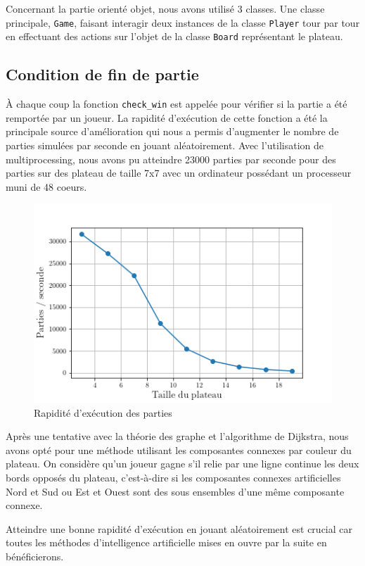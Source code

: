 \documentclass[a4paper]{article}
\theoremstyle{definition}
\begin{document}
Concernant la partie orienté objet, nous avons utilisé 3 classes. Une classe principale, \texttt{Game}, faisant interagir deux instances de la classe \texttt{Player} tour par tour en effectuant des actions sur l'objet de la classe \texttt{Board} représentant le plateau.

\subsection{Condition de fin de partie}

À chaque coup la fonction \texttt{check\_win} est appelée pour vérifier si la partie a été remportée par un joueur. La rapidité d'exécution de cette fonction a été la principale source d'amélioration qui nous a permis d'augmenter le nombre de parties simulées par seconde en jouant aléatoirement. Avec l'utilisation de multiprocessing, nous avons pu atteindre 23000 parties par seconde pour des parties sur des plateau de taille 7x7 avec un ordinateur possédant un processeur muni de 48 coeurs.


\begin{figure}[h]
	\centering
	\includegraphics[scale=0.6]{pps.png}
	\caption{Rapidité d'exécution des parties}
	\label{fig:pps}
\end{figure}


Après une tentative avec la théorie des graphe et l'algorithme de Dijkstra, nous avons opté pour une méthode utilisant les composantes connexes par couleur du plateau. 
On considère qu'un joueur gagne s'il relie par une ligne continue les deux bords opposés du plateau, c'est-à-dire si les composantes connexes artificielles Nord et Sud ou Est et Ouest sont des sous ensembles d'une même composante connexe.


Atteindre une bonne rapidité d'exécution en jouant aléatoirement est crucial car toutes les méthodes d'intelligence artificielle mises en ouvre par la suite en bénéficierons.
\end{document}
